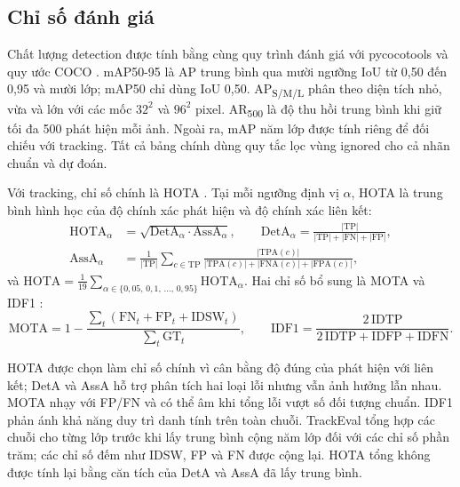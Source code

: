 \documentclass[fontsize=13pt,a4paper,oneside,parskip=false,numbers=noenddot,bibliography=totoc]{scrreprt}
\begin{document}
\subsection{Chỉ số đánh giá}
\label{sec:chi-so}

Chất lượng detection được tính bằng cùng quy trình đánh giá với pycocotools và quy ước COCO \cite{lin2014coco}. mAP50-95 là AP trung bình qua mười ngưỡng IoU từ 0,50 đến 0,95 và mười lớp; mAP50 chỉ dùng IoU 0,50. AP\textsubscript{S/M/L} phân theo diện tích nhỏ, vừa và lớn với các mốc $32^2$ và $96^2$ pixel. AR\textsubscript{500} là độ thu hồi trung bình khi giữ tối đa 500 phát hiện mỗi ảnh. Ngoài ra, mAP năm lớp được tính riêng để đối chiếu với tracking. Tất cả bảng chính dùng quy tắc lọc vùng ignored cho cả nhãn chuẩn và dự đoán.

Với tracking, chỉ số chính là HOTA \cite{luiten2021hota}. Tại mỗi ngưỡng định vị $\alpha$, HOTA là trung bình hình học của độ chính xác phát hiện và độ chính xác liên kết:
\begin{align}
  \mathrm{HOTA}_\alpha &= \sqrt{\mathrm{DetA}_\alpha \cdot \mathrm{AssA}_\alpha}, \qquad
  \mathrm{DetA}_\alpha = \frac{|\mathrm{TP}|}{|\mathrm{TP}| + |\mathrm{FN}| + |\mathrm{FP}|},
  \label{eq:hota}\\
  \mathrm{AssA}_\alpha &= \frac{1}{|\mathrm{TP}|}\sum_{c \in \mathrm{TP}} \frac{|\mathrm{TPA}(c)|}{|\mathrm{TPA}(c)| + |\mathrm{FNA}(c)| + |\mathrm{FPA}(c)|},
  \label{eq:assa}
\end{align}
và $\mathrm{HOTA} = \frac{1}{19}\sum_{\alpha \in \{0{,}05,\, 0{,}1,\, \dots,\, 0{,}95\}} \mathrm{HOTA}_\alpha$. Hai chỉ số bổ sung là MOTA \cite{bernardin2008clear} và IDF1 \cite{ristani2016idf1}:
\begin{equation}
  \mathrm{MOTA} = 1 - \frac{\sum_t (\mathrm{FN}_t + \mathrm{FP}_t + \mathrm{IDSW}_t)}{\sum_t \mathrm{GT}_t}, \qquad
  \mathrm{IDF1} = \frac{2\,\mathrm{IDTP}}{2\,\mathrm{IDTP} + \mathrm{IDFP} + \mathrm{IDFN}}.
  \label{eq:mota-idf1}
\end{equation}

HOTA được chọn làm chỉ số chính vì cân bằng độ đúng của phát hiện với liên kết; DetA và AssA hỗ trợ phân tích hai loại lỗi nhưng vẫn ảnh hưởng lẫn nhau. MOTA nhạy với FP/FN và có thể âm khi tổng lỗi vượt số đối tượng chuẩn. IDF1 phản ánh khả năng duy trì danh tính trên toàn chuỗi. TrackEval \cite{luiten2020trackeval} tổng hợp các chuỗi cho từng lớp trước khi lấy trung bình cộng năm lớp đối với các chỉ số phần trăm; các chỉ số đếm như IDSW, FP và FN được cộng lại. HOTA tổng không được tính lại bằng căn tích của DetA và AssA đã lấy trung bình.
\end{document}
